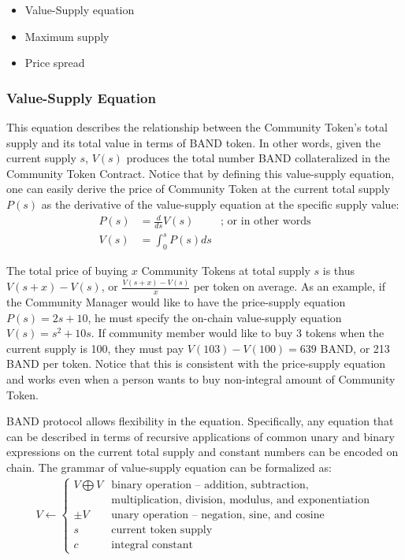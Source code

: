 \documentclass[letterpaper,11pt]{article}
\begin{document}
\begin{itemize}
\setlength\itemsep{0em}
\item Value-Supply equation
\item Maximum supply
\item Price spread
\end{itemize}

\subsubsection{Value-Supply Equation} This equation describes the relationship between the Community Token's total supply and its total value in terms of BAND token. In other words, given the current supply $s$, $V(s)$ produces the total number BAND collateralized in the Community Token Contract. Notice that by defining this value-supply equation, one can easily derive the price of Community Token at the current total supply $P(s)$ as the derivative of the value-supply equation at the specific supply value:
\bigbreak
\begin{align*}
P(s) &= \frac{d}{ds}V(s) & \text{; or in other words} \\
V(s) &= \int_{0}^{s} P(s) ds
\end{align*}

The total price of buying $x$ Community Tokens at total supply $s$ is thus $V(s+x)-V(s)$, or $\frac{V(s+x)-V(s)}{x}$ per token on average. As an example, if the Community Manager would like to have the price-supply equation $P(s) = 2s + 10$, he must specify the on-chain value-supply equation $V(s) = s^2 + 10s$. If community member would like to buy 3 tokens when the current supply is 100, they must pay $V(103)-V(100) =639$ BAND, or 213 BAND per token. Notice that this is consistent with the price-supply equation and works even when a person wants to buy non-integral amount of Community Token.

BAND protocol allows flexibility in the equation. Specifically, any equation that can be described in terms of recursive applications of common unary and binary expressions on the current total supply and constant numbers can be encoded on chain. The grammar of value-supply equation can be formalized as:
\begin{align*}
V \leftarrow
\begin{cases}
V \bigoplus V & \text{binary operation -- addition, subtraction, } \\
& \text{multiplication, division, modulus, and exponentiation} \\
\pm V & \text{unary operation -- negation, sine, and cosine} \\
s & \text{current token supply} \\
c & \text{integral constant}
\end{cases}
\end{align*}
\end{document}
